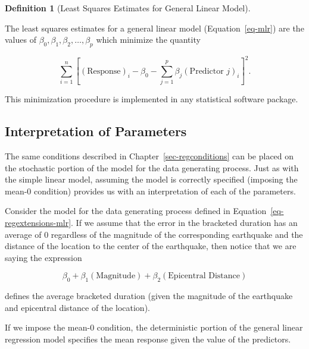 \documentclass[
  letterpaper,
  DIV=11,
  numbers=noendperiod]{scrreprt}
\theoremstyle{plain}
\theoremstyle{definition}
\theoremstyle{definition}
\newtheorem{definition}{Definition}[chapter]
\theoremstyle{remark}
\begin{document}
\begin{definition}[Least Squares Estimates for General Linear
Model]\protect\hypertarget{def-mlr-least-squares-estimates}{}\label{def-mlr-least-squares-estimates}

The least squares estimates for a general linear model
(Equation~\ref{eq-mlr}) are the values of
\(\beta_0, \beta_1, \beta_2, \dotsc, \beta_p\) which minimize the
quantity

\[\sum_{i=1}^n \left[(\text{Response})_i - \beta_0 - \sum_{j=1}^{p} \beta_j(\text{Predictor } j)_{i}\right]^2.\]

\end{definition}

This minimization procedure is implemented in any statistical software
package.

\subsection{Interpretation of
Parameters}\label{interpretation-of-parameters}

The same conditions described in Chapter~\ref{sec-regconditions} can be
placed on the stochastic portion of the model for the data generating
process. Just as with the simple linear model, assuming the model is
correctly specified (imposing the mean-0 condition) provides us with an
interpretation of each of the parameters.

Consider the model for the data generating process defined in
Equation~\ref{eq-regextensions-mlr}. If we assume that the error in the
bracketed duration has an average of 0 regardless of the magnitude of
the corresponding earthquake and the distance of the location to the
center of the earthquake, then notice that we are saying the expression

\[\beta_0 + \beta_1(\text{Magnitude}) + \beta_2(\text{Epicentral Distance})\]

defines the average bracketed duration (given the magnitude of the
earthquake and epicentral distance of the location).

\begin{tcolorbox}[enhanced jigsaw, breakable, titlerule=0mm, colframe=quarto-callout-tip-color-frame, bottomtitle=1mm, opacityback=0, rightrule=.15mm, toptitle=1mm, arc=.35mm, bottomrule=.15mm, left=2mm, title=\textcolor{quarto-callout-tip-color}{\faLightbulb}\hspace{0.5em}{Big Idea}, leftrule=.75mm, coltitle=black, toprule=.15mm, colbacktitle=quarto-callout-tip-color!10!white, colback=white, opacitybacktitle=0.6]

If we impose the mean-0 condition, the deterministic portion of the
general linear regression model specifies the mean response given the
value of the predictors.

\end{tcolorbox}
\end{document}
